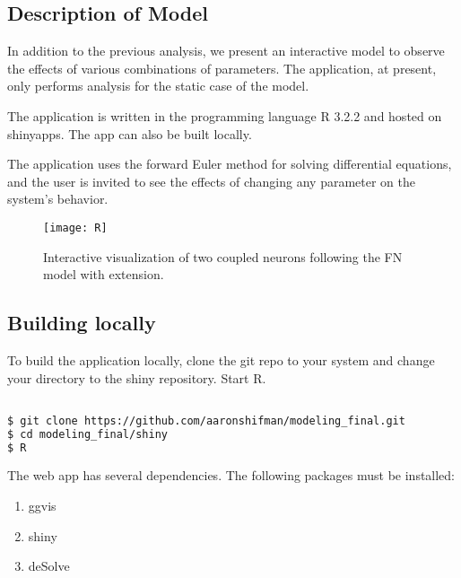 \documentclass[11pt]{report}
\begin{document}
\subsection{Description of Model} %
\label{sub:description_of_model}

In addition to the previous analysis, we present an interactive model to observe the effects of various combinations of parameters. The application, at present, only performs analysis for the static case of the model.

The application is written in the programming language R 3.2.2 and hosted on shinyapps. The app can also be built locally. 

The application uses the forward Euler method for solving differential equations, and the user is invited to see the effects of changing any parameter on the system's behavior. 


\begin{figure}[!ht]
  \caption{Interactive visualization of two coupled neurons following the FN model with extension. }
  \centering
    \texttt{[image: R]}
\end{figure}

\newpage

\subsection{Building locally} %
\label{sub:building_locally}

To build the application locally, clone the git repo to your system and change your directory to the shiny repository. Start R. 

\begin{lstlisting}[language = sh]

$ git clone https://github.com/aaronshifman/modeling_final.git
$ cd modeling_final/shiny 
$ R

\end{lstlisting}

The web app has several dependencies. The following packages must be installed:


\begin{enumerate}
  \item ggvis
  \item shiny
  \item deSolve
\end{enumerate}
\end{document}
